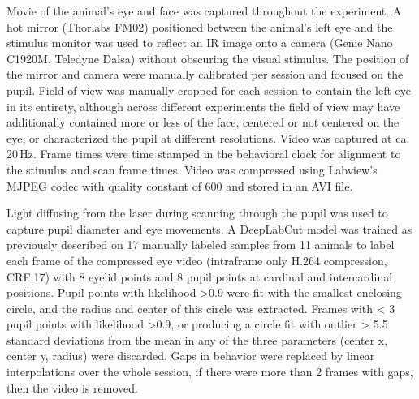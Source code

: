 \documentclass{article} %
\begin{document}
Movie of the animal's eye and face was captured throughout the experiment.  
A hot mirror (Thorlabs FM02) positioned between the animal's left eye and the stimulus monitor was used to reflect an IR image onto a camera (Genie Nano C1920M, Teledyne Dalsa) without obscuring the visual stimulus.  
The position of the mirror and camera were manually calibrated per session and focused on the pupil.  
Field of view was manually cropped for each session to contain the left eye in its entirety, although across different experiments the field of view may have additionally contained more or less of the face, centered or not centered on the eye, or characterized the pupil at different resolutions.  
Video was captured at ca. 20\,Hz.
Frame times were time stamped in the behavioral clock for alignment to the stimulus and scan frame times. 
Video was compressed using Labview’s MJPEG codec with quality constant of 600 and stored in an AVI file.

Light diffusing from the laser during scanning through the pupil was used to capture pupil diameter and eye movements.  
A DeepLabCut model \citep{Mathis2018-qj} was trained as previously described \citep{sensorium2023} on 17 manually labeled samples from 11 animals to label each frame of the compressed eye video (intraframe only H.264 compression, CRF:17) with 8 eyelid points and 8 pupil points at cardinal and intercardinal positions.  
Pupil points with likelihood >0.9 were fit with the smallest enclosing circle, and the radius and center of this circle was extracted.  
Frames with < 3 pupil points with likelihood >0.9, or producing a circle fit with outlier > 5.5 standard deviations from the mean in any of the three parameters (center x, center y, radius) were discarded.  
Gaps in behavior were replaced by linear interpolations over the whole session, if there were more than 2 frames with gaps, then the video is removed. 
\end{document}
